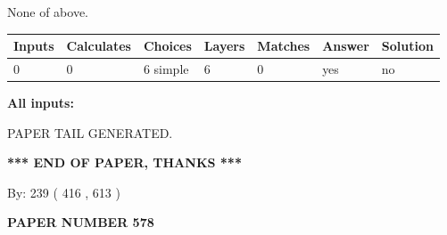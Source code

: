 \documentclass{ctexart}
\begin{document}
 
 None of above.
 
 
\noindent{}
 
 
   
   
   
   
\noindent\begin{tabular}{|l|l|l|l|l|l|l|}
 \hline
Inputs & Calculates & Choices & Layers & Matches & Answer & Solution \\ \hline
 0  & 
 0  & 
 6
  simple  
  & 
 6  & 
 0  & 
  yes & 
  no 
  \\ \hline
 \end{tabular}
   
   
   
   
\noindent{}
   
   
   
   
\noindent\vspace{0.1in}\hspace{-0.08in} {\textbf{\Large{All inputs: }}}
   
   
   
   
   
   
 \vspace{0.2in}
 
   
   
\vspace{2.0in} PAPER TAIL GENERATED.
   
   
   
   
\vspace{1.0in} 
{\textbf{\large{ *** END OF PAPER, THANKS *** }}} 
   
   
\hspace{1.0in} By: 
 239 ( 416 ,  613 )
   
   
   
   
\newpage 
\setcounter{page}{ 
   578001 } 
   
   
   
   
 {\textbf{ \Large{ PAPER NUMBER  578  }}}
   
   
\vspace{0.2in}
   
   
   
   
   
   
   
\end{document}
